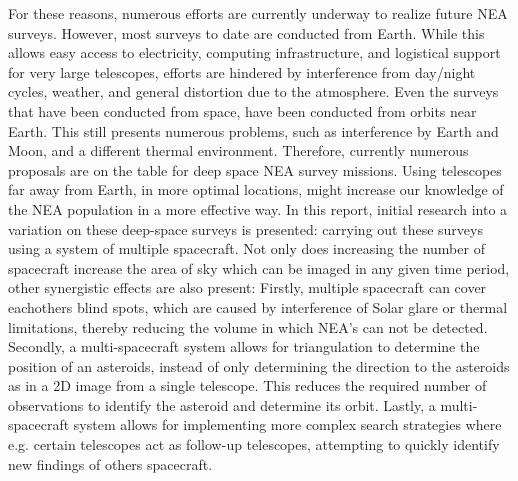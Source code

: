 For these reasons, numerous efforts are currently underway to realize future NEA surveys. However, most surveys to date are conducted from Earth. While this allows easy access to electricity, computing infrastructure, and logistical support for very large telescopes, efforts are hindered by interference from day/night cycles, weather, and general distortion due to the atmosphere. Even the surveys that have been conducted from space, have been conducted from orbits near Earth. This still presents numerous problems, such as interference by Earth and Moon, and a different thermal environment. Therefore, currently numerous proposals are on the table for deep space NEA survey missions. Using telescopes far away from Earth, in more optimal locations, might increase our knowledge of the NEA population in a more effective way. In this report, initial research into a variation on these deep-space surveys is presented: carrying out these surveys using a system of multiple spacecraft. Not only does increasing the number of spacecraft increase the area of sky which can be imaged in any given time period, other synergistic effects are also present: Firstly, multiple spacecraft can cover eachothers blind spots, which are caused by interference of Solar glare or thermal limitations, thereby reducing the volume in which NEA's can not be detected. Secondly, a multi-spacecraft system allows for triangulation to determine the position of an asteroids, instead of only determining the direction to the asteroids as in a 2D image from a single telescope. This reduces the required number of observations to identify the asteroid and determine its orbit. Lastly, a multi-spacecraft system allows for implementing more complex search strategies where e.g. certain telescopes act as follow-up telescopes, attempting to quickly identify new findings of others spacecraft. \\

